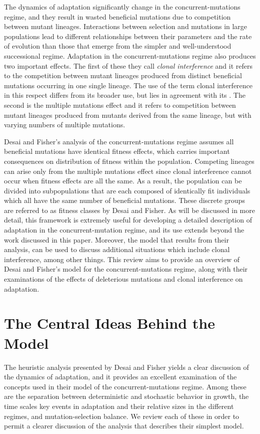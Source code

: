 \documentclass[12pt, one column]{article}
\begin{document}
The dynamics of adaptation significantly change in the concurrent-mutations regime, and they result in wasted beneficial mutations due to competition between mutant lineages.  Interactions between selection and mutations in large populations lead to different relationships between their parameters and the rate of evolution than those that emerge from the simpler and well-understood successional regime.  Adaptation in the concurrent-mutations regime also produces two important effects.  The first of these they call \textit{clonal interference} and it refers to the competition between mutant lineages produced from distinct beneficial mutations occurring in one single lineage.  The use of the term clonal interference in this respect differs from its broader use, but lies in agreement with its .  The second is the multiple mutations effect and it refers to competition between mutant lineages produced from mutants derived from the same lineage, but with varying numbers of multiple mutations.  

Desai and Fisher's analysis of the concurrent-mutations regime assumes all beneficial mutations have identical fitness effects, which carries important consequences on distribution of fitness within the population.  Competing lineages can arise only from the multiple mutations effect since clonal interference cannot occur when fitness effects are all the same.  As a result, the population can be divided into subpopulations that are each composed of identically fit individuals which all have the same number of beneficial mutations.  These discrete groups are referred to as fitness classes by Desai and Fisher.  As will be discussed in more detail, this framework is extremely useful for developing a detailed description of adaptation in the concurrent-mutation regime, and its use extends beyond the work discussed in this paper.  Moreover, the model that results from their analysis, can be used to discuss additional situations which include clonal interference, among other things.  This review aims to provide an overview of Desai and Fisher's model for the concurrent-mutations regime, along with their examinations of the effects of deleterious mutations and clonal interference on adaptation.

\section*{The Central Ideas Behind the Model}
The heuristic analysis presented by Desai and Fisher yields a clear discussion of the dynamics of adaptation, and it provides an excellent examination of the concepts used in their model of the concurrent-mutations regime.  Among these are the separation between deterministic and stochastic behavior in growth, the time scales key events in adaptation and their relative sizes in the different regimes, and mutation-selection balance.  We review each of these in order to permit a clearer discussion of the analysis that describes their simplest model.     
\end{document}
